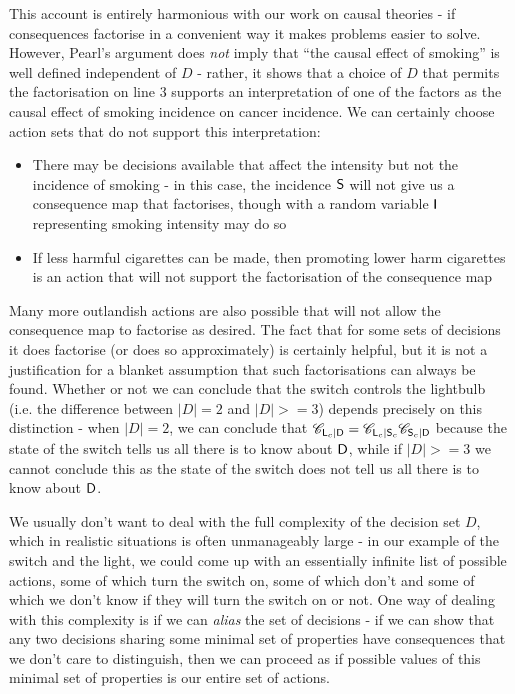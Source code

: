 This account is entirely harmonious with our work on causal theories - if consequences factorise in a convenient way it makes problems easier to solve. However, Pearl's argument does \emph{not} imply that ``the causal effect of smoking'' is well defined independent of $D$ - rather, it shows that a choice of $D$ that permits the factorisation on line 3 supports an interpretation of one of the factors as the causal effect of smoking incidence on cancer incidence. We can certainly choose action sets that do not support this interpretation:

\begin{itemize}
	\item There may be decisions available that affect the intensity but not the incidence of smoking - in this case, the incidence $\mathsf{S}$ will not give us a consequence map that factorises, though with a random variable $\mathsf{I}$ representing smoking intensity may do so 
	\item If less harmful cigarettes can be made, then promoting lower harm cigarettes is an action that will not support the factorisation of the consequence map
\end{itemize}

Many more outlandish actions are also possible that will not allow the consequence map to factorise as desired. The fact that for some sets of decisions it does factorise (or does so approximately) is certainly helpful, but it is not a justification for a blanket assumption that such factorisations can always be found. Whether or not we can conclude that the switch controls the lightbulb (i.e. the difference between $|D|=2$ and $|D|>=3$) depends precisely on this distinction - when $|D|=2$, we can conclude that $\mathscr{C}_{\mathsf{L}_c|\mathsf{D}} = \mathscr{C}_{\mathsf{L}_c|\mathsf{S}_c}\mathscr{C}_{\mathsf{S}_c|\mathsf{D}}$ because the state of the switch tells us all there is to know about $\mathsf{D}$, while if $|D|>=3$ we cannot conclude this as the state of the switch does not tell us all there is to know about $\mathsf{D}$.



We usually don't want to deal with the full complexity of the decision set $D$, which in realistic situations is often unmanageably large - in our example of the switch and the light, we could come up with an essentially infinite list of possible actions, some of which turn the switch on, some of which don't and some of which we don't know if they will turn the switch on or not. One way of dealing with this complexity is if we can \emph{alias} the set of decisions - if we can show that any two decisions sharing some minimal set of properties have consequences that we don't care to distinguish, then we can proceed as if possible values of this minimal set of properties is our entire set of actions.

